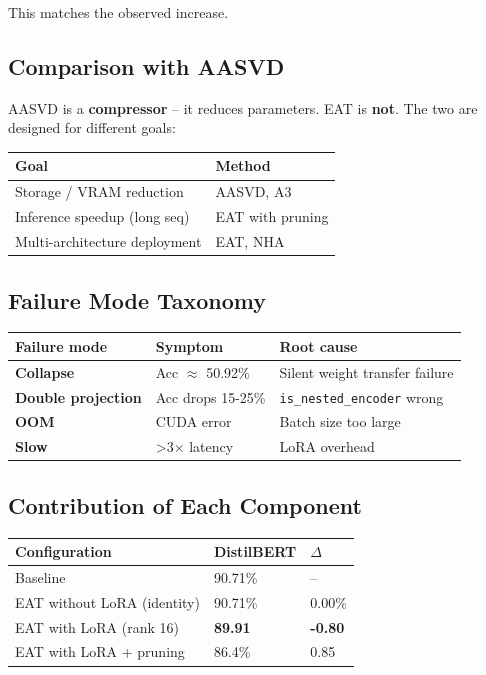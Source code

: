 This matches the observed increase.

\subsection{Comparison with AASVD}

AASVD is a \textbf{compressor} -- it reduces parameters. EAT is \textbf{not}. The two 
are designed for different goals:

\begin{table}[H]
\centering
\small
\begin{tabular}{ll}
\toprule
\textbf{Goal} & \textbf{Method} \\
\midrule
Storage / VRAM reduction & AASVD, A3 \\
Inference speedup (long seq) & EAT with pruning \\
Multi-architecture deployment & EAT, NHA \\
\bottomrule
\end{tabular}
\end{table}

\subsection{Failure Mode Taxonomy}

\begin{table}[H]
\centering
\small
\begin{tabular}{lll}
\toprule
\textbf{Failure mode} & \textbf{Symptom} & \textbf{Root cause} \\
\midrule
\textbf{Collapse} & Acc $\approx$ 50.92\% & Silent weight transfer failure \\
\textbf{Double projection} & Acc drops 15-25\% & \texttt{is\_nested\_encoder} wrong \\
\textbf{OOM} & CUDA error & Batch size too large \\
\textbf{Slow} & \textgreater{}3$\times$ latency & LoRA overhead \\
\bottomrule
\end{tabular}
\end{table}

\subsection{Contribution of Each Component}

\begin{table}[H]
\centering
\small
\begin{tabular}{lll}
\toprule
\textbf{Configuration} & \textbf{DistilBERT} & \textbf{$\Delta$} \\
\midrule
Baseline & 90.71\% & -- \\
EAT without LoRA (identity) & 90.71\% & 0.00\% \\
EAT with LoRA (rank 16) & \textbf{89.91} & \textbf{-0.80} \\
EAT with LoRA + pruning & 86.4\% & 0.85 \\
\bottomrule
\end{tabular}
\end{table}

